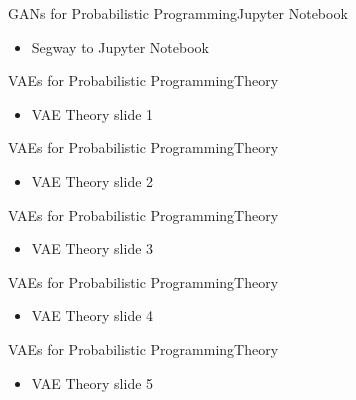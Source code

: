 \documentclass[AERbeamer%
              ,optEnglish%
              ,optBiber%
              ,optBibstyleAlphabetic%
              ,optBeamerClassicFormat%
              ]{AERlatex}%
\begin{document}
\begin{frame}[c]{GANs for Probabilistic Programming}{Jupyter Notebook}
    \centering
    \begin{itemize}
        \item Segway to Jupyter Notebook
    \end{itemize}
\end{frame}



\begin{frame}[c]{VAEs for Probabilistic Programming}{Theory}
    \centering
    \begin{itemize}
        \item VAE Theory slide 1
    \end{itemize}
\end{frame}


\begin{frame}[c]{VAEs for Probabilistic Programming}{Theory}
    \centering
    \begin{itemize}
        \item VAE Theory slide 2
    \end{itemize}
\end{frame}


\begin{frame}[c]{VAEs for Probabilistic Programming}{Theory}
    \centering
    \begin{itemize}
        \item VAE Theory slide 3
    \end{itemize}
\end{frame}


\begin{frame}[c]{VAEs for Probabilistic Programming}{Theory}
    \centering
    \begin{itemize}
        \item VAE Theory slide 4
    \end{itemize}
\end{frame}


\begin{frame}[c]{VAEs for Probabilistic Programming}{Theory}
    \centering
    \begin{itemize}
        \item VAE Theory slide 5
    \end{itemize}
\end{frame}
\end{document}
